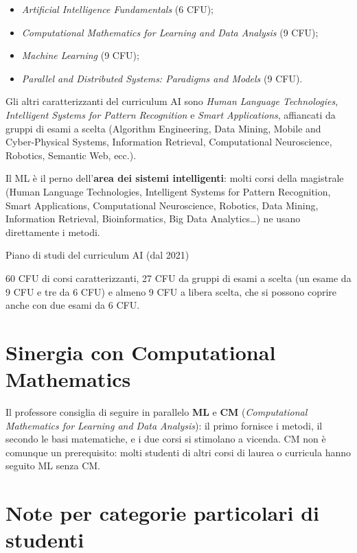 \begin{itemize}
\tightlist
\item
  \emph{Artificial Intelligence Fundamentals} (6 CFU);
\item
  \emph{Computational Mathematics for Learning and Data Analysis} (9
  CFU);
\item
  \emph{Machine Learning} (9 CFU);
\item
  \emph{Parallel and Distributed Systems: Paradigms and Models} (9 CFU).
\end{itemize}

Gli altri caratterizzanti del curriculum AI sono \emph{Human Language
Technologies}, \emph{Intelligent Systems for Pattern Recognition} e
\emph{Smart Applications}, affiancati da gruppi di esami a scelta
(Algorithm Engineering, Data Mining, Mobile and Cyber-Physical Systems,
Information Retrieval, Computational Neuroscience, Robotics, Semantic
Web, ecc.).

Il ML è il perno dell'\textbf{area dei sistemi intelligenti}: molti
corsi della magistrale (Human Language Technologies, Intelligent Systems
for Pattern Recognition, Smart Applications, Computational Neuroscience,
Robotics, Data Mining, Information Retrieval, Bioinformatics, Big Data
Analytics\ldots) ne usano direttamente i metodi.

\begin{boxnote}{Piano di studi del curriculum AI (dal 2021)}

60 CFU di corsi caratterizzanti, 27 CFU da gruppi di esami a scelta (un
esame da 9 CFU e tre da 6 CFU) e almeno 9 CFU a libera scelta, che si
possono coprire anche con due esami da 6 CFU.

\end{boxnote}

\section{Sinergia con Computational
Mathematics}\label{sinergia-con-computational-mathematics}

Il professore consiglia di seguire in parallelo \textbf{ML} e
\textbf{CM} (\emph{Computational Mathematics for Learning and Data
Analysis}): il primo fornisce i metodi, il secondo le basi matematiche,
e i due corsi si stimolano a vicenda. CM non è comunque un prerequisito:
molti studenti di altri corsi di laurea o curricula hanno seguito ML
senza CM.

\section{Note per categorie particolari di
studenti}\label{note-per-categorie-particolari-di-studenti}

